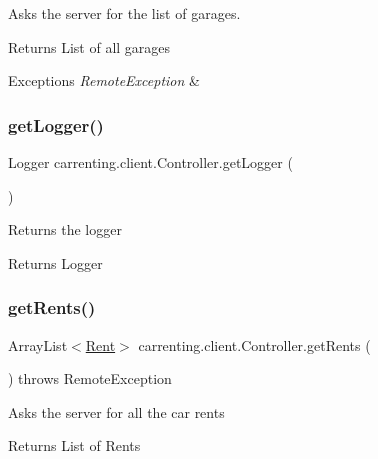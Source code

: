 Asks the server for the list of garages.

\begin{DoxyReturn}{Returns}
List of all garages 
\end{DoxyReturn}

\begin{DoxyExceptions}{Exceptions}
{\em Remote\+Exception} & \\
\hline
\end{DoxyExceptions}
\mbox{\label{classcarrenting_1_1client_1_1_controller_a34a0edf53b5204f26b1a39ff4d8fa316}} 
\subsubsection{\texorpdfstring{getLogger()}{getLogger()}}
{\footnotesize\ttfamily Logger carrenting.\+client.\+Controller.\+get\+Logger (\begin{DoxyParamCaption}{ }\end{DoxyParamCaption})}

Returns the logger \begin{DoxyReturn}{Returns}
Logger 
\end{DoxyReturn}
\mbox{\label{classcarrenting_1_1client_1_1_controller_a4ba12c757900989ed2755f9924410a4b}} 
\subsubsection{\texorpdfstring{getRents()}{getRents()}}
{\footnotesize\ttfamily Array\+List$<$\mbox{\hyperlink{classcarrenting_1_1server_1_1jdo_1_1_rent}{Rent}}$>$ carrenting.\+client.\+Controller.\+get\+Rents (\begin{DoxyParamCaption}{ }\end{DoxyParamCaption}) throws Remote\+Exception}

Asks the server for all the car rents

\begin{DoxyReturn}{Returns}
List of Rents 
\end{DoxyReturn}

